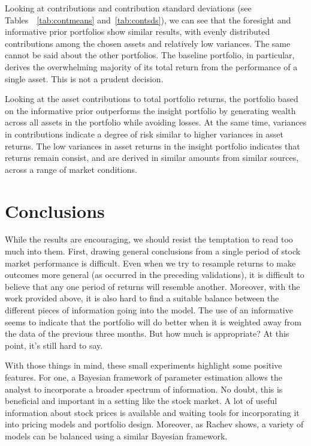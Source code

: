 \documentclass[a4paper]{article}\usepackage[]{graphicx}\usepackage[]{color}
\begin{document}
Looking at contributions and contribution standard deviations (see Tables~~\ref{tab:contmeans} and~\ref{tab:contsds}), we can see that the foresight and informative prior portfolios show similar results, with evenly distributed contributions among the chosen assets and relatively low variances. The same cannot be said about the other portfolios. The baseline portfolio, in particular, derives the overwhelming majority of its total return from the performance of a single asset. This is not a prudent decision.

Looking at the asset contributions to total portfolio returns, the portfolio based on the informative prior outperforms the insight portfolio by generating wealth across all assets in the portfolio while avoiding losses. At the same time, variances in contributions indicate a degree of risk similar to higher variances in asset returns. The low variances in asset returns in the insight portfolio indicates that returns remain consist, and are derived in similar amounts from similar sources, across a range of market conditions.

\section{Conclusions}

While the results are encouraging, we should resist the temptation to read too much into them. First, drawing general conclusions from a single period of stock market performance is difficult. Even when we try to resample returns to make outcomes more general (as occurred in the preceding validations), it is difficult to believe that any one period of returns will resemble another. Moreover, with the work provided above, it is also hard to find a suitable balance between the different pieces of information going into the model. The use of an informative seems to indicate that the portfolio will do better when it is weighted away from the data of the previous three months. But how much is appropriate? At this point, it's still hard to say.

With those things in mind, these small experiments highlight some positive features. For one, a Bayesian framework of parameter estimation allows the analyst to incorporate a broader spectrum of information. No doubt, this is beneficial and important in a setting like the stock market. A lot of useful information about stock prices is available and waiting tools for incorporating it into pricing models and portfolio design. Moreover, as Rachev shows, \cite{rachev04} a variety of models can be balanced using a similar Bayesian framework. 
\end{document}
